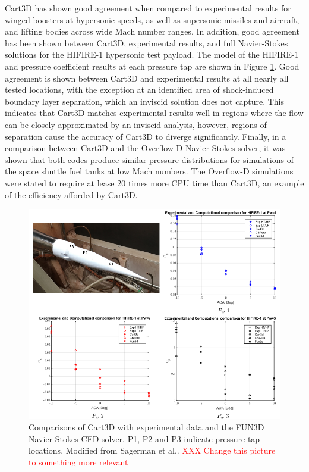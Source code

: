 Cart3D has shown good agreement when compared to experimental results for winged boosters at hypersonic speeds\cite{Sagerman2017}, as well as supersonic missiles\cite{Abeynayake} and aircraft\cite{Aftosmis2011}, and lifting bodies across wide Mach number ranges\cite{Almosnino2016a}.
In addition, good agreement has been shown between Cart3D, experimental results, and full Navier-Stokes solutions for the HIFIRE-1 hypersonic test payload\cite{Sagerman2017}. The model of the HIFIRE-1 and pressure coefficient results at each pressure tap are shown in Figure \ref{fig:Cart3DComparisons}. 
Good agreement is shown between Cart3D and experimental results at all nearly all tested locations, with the exception at an identified area of shock-induced boundary layer separation, which an inviscid solution does not capture\cite{Sagerman2017}. 
This indicates that Cart3D matches experimental results well in regions where the flow can be closely approximated by an inviscid analysis, however, regions of separation cause the accuracy of Cart3D to diverge significantly. 
Finally, in a comparison between Cart3D and the Overflow-D Navier-Stokes solver, it was shown that both codes produce similar pressure distributions for simulations of the space shuttle fuel tanks at low Mach numbers\cite{Gomez2004}. The Overflow-D simulations were stated to require at lease 20 times more CPU time than Cart3D\cite{Gomez2004}, an example of the efficiency afforded by Cart3D.
\begin{figure}[ht]
\centering
\includegraphics[width=0.9\linewidth]{"figures/2_literature-review/Cart3D Comparisons"}
\caption{Comparisons of Cart3D with experimental data and the FUN3D Navier-Stokes CFD solver. P1, P2 and P3 indicate pressure tap locations. Modified from Sagerman et al.\cite{Sagerman2017}. \textcolor{red}{XXX Change this picture to something more relevant}}
\label{fig:Cart3DComparisons}
\end{figure}



